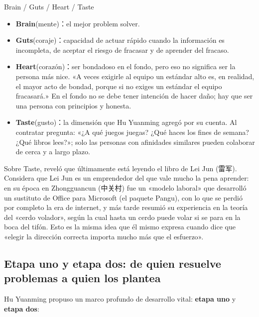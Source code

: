 \documentclass[a4paper]{article}
\begin{document}
\begin{importantbox}{{Brain / Guts / Heart / Taste}}
\begin{itemize}
\item \textbf{Brain}(mente)：el mejor problem solver.
\item \textbf{Guts}(coraje)：capacidad de actuar rápido cuando la información es incompleta, de aceptar el riesgo de fracasar y de aprender del fracaso.
\item \textbf{Heart}(corazón)：ser bondadoso en el fondo, pero eso no significa ser la persona más nice. «A veces exigirle al equipo un estándar alto es, en realidad, el mayor acto de bondad, porque si no exiges un estándar el equipo fracasará.» En el fondo no se debe tener intención de hacer daño; hay que ser una persona con principios y honesta.
\item \textbf{Taste}(gusto)：la dimensión que Hu Yuanming agregó por su cuenta. Al contratar pregunta: «¿A qué juegos juegas? ¿Qué haces los fines de semana? ¿Qué libros lees?»; solo las personas con afinidades similares pueden colaborar de cerca y a largo plazo.
\end{itemize}
\end{importantbox}

Sobre Taste, reveló que últimamente está leyendo el libro de Lei Jun (雷军). Considera que Lei Jun es un emprendedor del que vale mucho la pena aprender: en su época en Zhongguancun (中关村) fue un «modelo laboral» que desarrolló un sustituto de Office para Microsoft (el paquete Pangu), con lo que se perdió por completo la era de internet, y más tarde resumió su experiencia en la teoría del «cerdo volador», según la cual hasta un cerdo puede volar si se para en la boca del tifón. Esto es la misma idea que él mismo expresa cuando dice que «elegir la dirección correcta importa mucho más que el esfuerzo».

\subsection{Etapa uno y etapa dos: de quien resuelve problemas a quien los plantea}

Hu Yuanming propuso un marco profundo de desarrollo vital: \textbf{etapa uno} y \textbf{etapa dos}:
\end{document}
